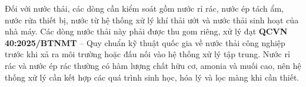 \documentclass[../main.tex]{subfiles}
\begin{document}
\begin{table}[htbp]
\centering
\caption{Một số giới hạn khí thải cần xét theo QCVN 19:2024/BTNMT}
\label{tab:gioi-han-khi-thai-qcvn19}
\setlength{\tabcolsep}{6pt}
\end{table}

Đối với nước thải, các dòng cần kiểm soát gồm nước rỉ rác, nước ép tách ẩm, nước rửa thiết bị, nước từ hệ thống xử lý khí thải ướt và nước thải sinh hoạt của nhà máy. Các dòng nước thải này phải được thu gom riêng, xử lý đạt \textbf{QCVN 40:2025/BTNMT} -- Quy chuẩn kỹ thuật quốc gia về nước thải công nghiệp \cite{QCVN40_2025_BTNMT} trước khi xả ra môi trường hoặc đấu nối vào hệ thống xử lý tập trung. Nước rỉ rác và nước ép rác thường có hàm lượng chất hữu cơ, amonia và muối cao, nên hệ thống xử lý cần kết hợp các quá trình sinh học, hóa lý và lọc màng khi cần thiết.
\end{document}
